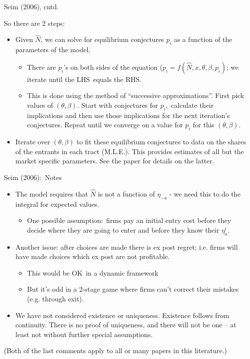 \documentclass[aspectratio=169,11pt]{beamer}
\begin{document}
\begin{frame}{Seim (2006), cntd.}

So there are 2 steps:
\begin{itemize}
\item Given $\hat{N}$, we can solve for equilibrium conjectures $p_{i}$ as a
function of the parameters of the model.
\begin{itemize}
\item There are $p_{i}$'s on both sides of the equation ($p_{i}=f(\hat{N}%
,x,\theta ,\beta ,p_{i})$; we iterate until the LHS\ equals the RHS.
\item This is done using the method of \textquotedblleft successive
approximations\textquotedblright . First pick values of $(\theta ,\beta )$.
Start with conjectures for $p_{i},$ calculate their implications and then
use those implications for the next iteration's conjectures. Repeat until we
converge on a value for $p_{i}$ for this $(\theta ,\beta ).$
\end{itemize}
\item Iterate over $(\theta ,\beta )$ to fit these equilibrium conjectures
to data on the shares of the entrants in each tract (M.L.E.). This provides
estimates of all but the market specific parameters. See the paper for
details on the latter.
\end{itemize}
\end{frame}


\begin{frame}{Seim (2006):\ Notes}
\begin{itemize}
\item The model requires that $\hat{N}$ is not a function of $\eta _{-a}$ -
we need this to do the integral for expected values.
\begin{itemize}
\item One possible assumption:\ firms pay an initial entry cost before they
decide where they are going to enter and before they know their $\eta
_{a}^{i}$.
\end{itemize}
\item Another issue: after choices are made there is ex post regret; i.e.
firms will have made choices which ex post are not profitable.
\begin{itemize}
\item This would be OK\ in a dynamic framework
\item But it's odd in a 2-stage game where firms can't correct their
mistakes (e.g. through exit).
\end{itemize}
\item We have not considered existence or uniqueness. Existence follows from
continuity. There is no proof of uniqueness, and there will not be one -- at
least not without further special assumptions.
\end{itemize}
(Both of the last comments apply to all or many papers in this literature.)
\end{frame}%
\end{document}
